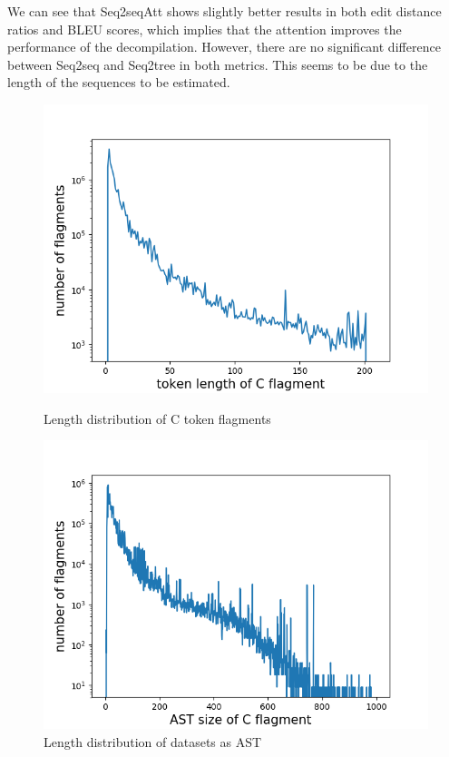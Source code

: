 \documentclass[senior,final,11pt]{iscs-thesis}
\begin{document}
We can see that Seq2seqAtt shows slightly better results in both edit distance ratios and BLEU scores,
 which implies that the attention improves the performance of the decompilation.
However, there are no significant difference between Seq2seq and Seq2tree in both metrics.
This seems to be due to the length of the sequences to be estimated.

\begin{figure}[]
	\includegraphics[width=12cm]{c_lens.png}
	\caption{Length distribution of C token flagments}
	\label{fig:csizes}
	\includegraphics[width=12cm]{ast_lens.png}
	\caption{Length distribution of datasets as AST}
	\label{fig:astsizes}
\end{figure}
\end{document}
